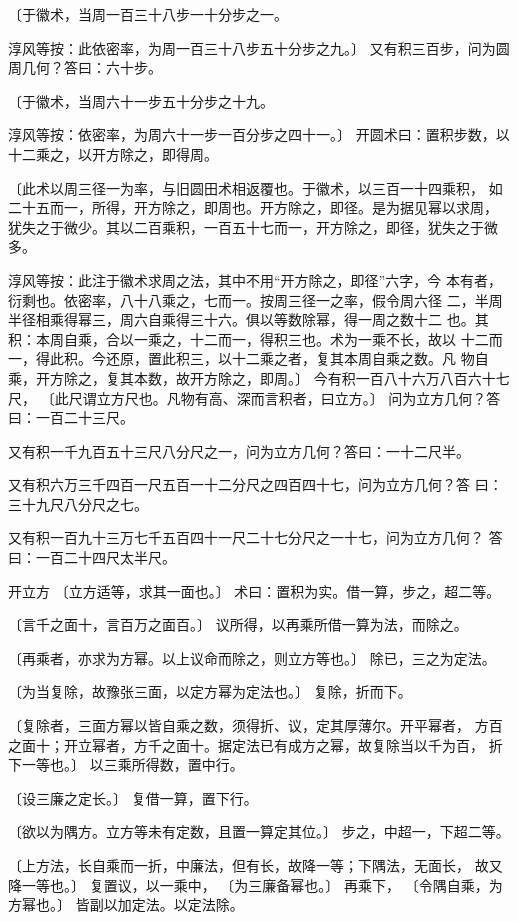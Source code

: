 \documentclass[a4paper,12pt,UTF8,twoside]{ctexbook}
\begin{document}
〔于徽术，当周一百三十八步一十分步之一。

淳风等按：此依密率，为周一百三十八步五十分步之九。〕 又有积三百步，问为圆周几何？答曰：六十步。

〔于徽术，当周六十一步五十分步之十九。

淳风等按：依密率，为周六十一步一百分步之四十一。〕 开圆术曰：置积步数，以十二乘之，以开方除之，即得周。

〔此术以周三径一为率，与旧圆田术相返覆也。于徽术，以三百一十四乘积， 如二十五而一，所得，开方除之，即周也。开方除之，即径。是为据见幂以求周， 犹失之于微少。其以二百乘积，一百五十七而一，开方除之，即径，犹失之于微 多。

淳风等按：此注于徽术求周之法，其中不用“开方除之，即径”六字，今 本有者，衍剩也。依密率，八十八乘之，七而一。按周三径一之率，假令周六径 二，半周半径相乘得幂三，周六自乘得三十六。俱以等数除幂，得一周之数十二 也。其积：本周自乘，合以一乘之，十二而一，得积三也。术为一乘不长，故以 十二而一，得此积。今还原，置此积三，以十二乘之者，复其本周自乘之数。凡 物自乘，开方除之，复其本数，故开方除之，即周。〕 今有积一百八十六万八百六十七尺， 〔此尺谓立方尺也。凡物有高、深而言积者，曰立方。〕 问为立方几何？答曰：一百二十三尺。

又有积一千九百五十三尺八分尺之一，问为立方几何？答曰：一十二尺半。

又有积六万三千四百一尺五百一十二分尺之四百四十七，问为立方几何？答 曰：三十九尺八分尺之七。

又有积一百九十三万七千五百四十一尺二十七分尺之一十七，问为立方几何？ 答曰：一百二十四尺太半尺。

开立方 〔立方适等，求其一面也。〕 术曰：置积为实。借一算，步之，超二等。

〔言千之面十，言百万之面百。〕 议所得，以再乘所借一算为法，而除之。

〔再乘者，亦求为方幂。以上议命而除之，则立方等也。〕 除已，三之为定法。

〔为当复除，故豫张三面，以定方幂为定法也。〕 复除，折而下。

〔复除者，三面方幂以皆自乘之数，须得折、议，定其厚薄尔。开平幂者， 方百之面十；开立幂者，方千之面十。据定法已有成方之幂，故复除当以千为百， 折下一等也。〕 以三乘所得数，置中行。

〔设三廉之定长。〕 复借一算，置下行。

〔欲以为隅方。立方等未有定数，且置一算定其位。〕 步之，中超一，下超二等。

〔上方法，长自乘而一折，中廉法，但有长，故降一等；下隅法，无面长， 故又降一等也。〕 复置议，以一乘中， 〔为三廉备幂也。〕 再乘下， 〔令隅自乘，为方幂也。〕 皆副以加定法。以定法除。
\end{document}
